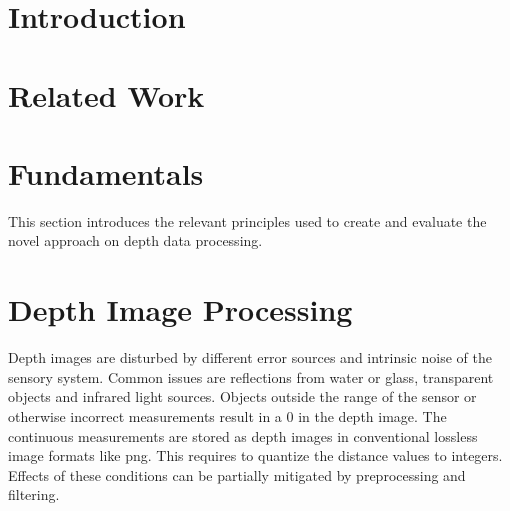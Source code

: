\documentclass[doktyp=marbeit,fontsize=12pt,sprache=english,hausschrift=true,draft=false]{TUBAFarbeiten}
\begin{document}
\maketitle
{}
\TUBAFErklaerungsseite%


\newpage

\newpage

\tableofcontents
\newpage



\newpage

\section{Introduction}

\newpage

\section{Related Work}

\newpage

\section{Fundamentals}

This section introduces the relevant principles used to create and evaluate the novel approach on depth data processing.






\newpage

\section{Depth Image Processing}

Depth images are disturbed by different error sources and intrinsic noise of the sensory system.
Common issues are reflections from water or glass, transparent objects and infrared light sources.
Objects outside the range of the sensor or otherwise incorrect measurements result in a $0$ in the depth image.
The continuous measurements are stored as depth images in conventional lossless image formats like png.
This requires to quantize the distance values to integers.
Effects of these conditions can be partially mitigated by preprocessing and filtering.




\newpage
\end{document}

